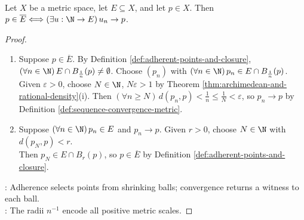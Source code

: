 \begin{proposition} \label{prop:sequential-closure-criterion} \\
Let $X$ be a metric space, let $E\subseteq X$, and let $p\in X$. Then $p\in\overline{E}\Longleftrightarrow(\exists u:\N\to E)\,u_n\to p$.
\begin{proof}
\begin{enumerate}[label=\roman*.]
\setlength{\itemsep}{0pt}
\item[$(\Rightarrow)$] Suppose $p\in\overline{E}$. By Definition \ref{def:adherent-points-and-closure}, $(\forall n\in\N)\,E\cap B_{\frac{1}{n}}(p)\neq\emptyset$. Choose $(p_n)$ with $(\forall n\in\N)\,p_n\in E\cap B_{\frac{1}{n}}(p)$.\\
Given $\varepsilon>0$, choose $N\in\N$, $N\varepsilon>1$ by Theorem \ref{thm:archimedean-and-rational-density}(i). Then $(\forall n\geq N)\,d(p_n,p)<\frac{1}{n}\leq\frac{1}{N}<\varepsilon$, so $p_n\to p$ by Definition \ref{def:sequence-convergence-metric}.
\item[$(\Leftarrow)$] Suppose $(\forall n\in\N)\,p_n\in E$ and $p_n\to p$. Given $r>0$, choose $N\in\N$ with $d(p_N,p)<r$.\\
Then $p_N\in E\cap B_r(p)$, so $p\in\overline{E}$ by Definition \ref{def:adherent-points-and-closure}.
\end{enumerate}
: Adherence selects points from shrinking balls; convergence returns a witness to each ball.\\
: The radii $n^{-1}$ encode all positive metric scales.
\end{proof}
\end{proposition}

